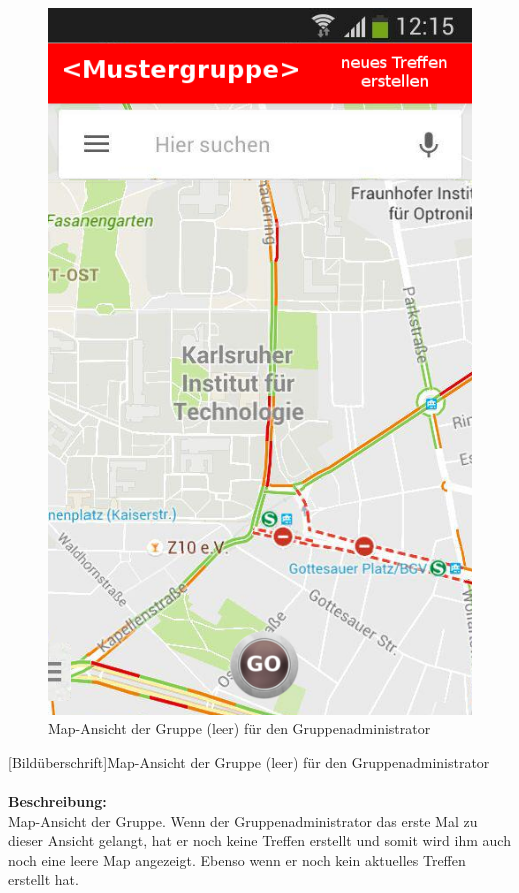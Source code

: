 \begin{figure}[H]
	\caption{Map-Ansicht der Gruppe (leer) für den Gruppenadministrator}
\begin{center}
	\includegraphics[scale =0.5]{resources/images/map_leer_Admin.png}
\end{center}
\end{figure}
[Bildüberschrift]Map-Ansicht der Gruppe (leer) für den Gruppenadministrator\\ \\
\textbf{Beschreibung:}\\
Map-Ansicht der Gruppe. Wenn der Gruppenadministrator das erste Mal zu dieser Ansicht gelangt, hat er noch keine Treffen erstellt und somit wird ihm auch noch eine leere Map angezeigt. Ebenso wenn er noch kein aktuelles Treffen erstellt hat.\\
